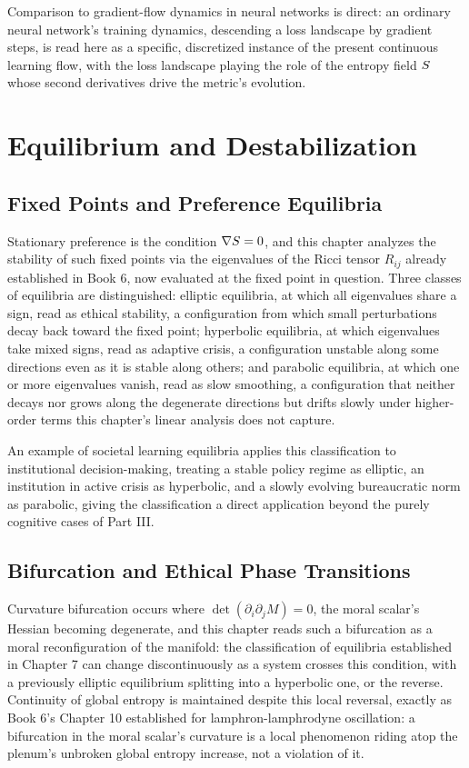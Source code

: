 Comparison to gradient-flow dynamics in neural networks is direct: an ordinary neural network's training dynamics, descending a loss landscape by gradient steps, is read here as a specific, discretized instance of the present continuous learning flow, with the loss landscape playing the role of the entropy field $S$ whose second derivatives drive the metric's evolution.

\part{Equilibrium and Destabilization}

\chapter{Fixed Points and Preference Equilibria}

Stationary preference is the condition $\nabla S = 0$, and this chapter analyzes the stability of such fixed points via the eigenvalues of the Ricci tensor $R_{ij}$ already established in Book 6, now evaluated at the fixed point in question. Three classes of equilibria are distinguished: elliptic equilibria, at which all eigenvalues share a sign, read as ethical stability, a configuration from which small perturbations decay back toward the fixed point; hyperbolic equilibria, at which eigenvalues take mixed signs, read as adaptive crisis, a configuration unstable along some directions even as it is stable along others; and parabolic equilibria, at which one or more eigenvalues vanish, read as slow smoothing, a configuration that neither decays nor grows along the degenerate directions but drifts slowly under higher-order terms this chapter's linear analysis does not capture.

An example of societal learning equilibria applies this classification to institutional decision-making, treating a stable policy regime as elliptic, an institution in active crisis as hyperbolic, and a slowly evolving bureaucratic norm as parabolic, giving the classification a direct application beyond the purely cognitive cases of Part III.

\chapter{Bifurcation and Ethical Phase Transitions}

Curvature bifurcation occurs where $\det(\partial_i \partial_j M) = 0$, the moral scalar's Hessian becoming degenerate, and this chapter reads such a bifurcation as a moral reconfiguration of the manifold: the classification of equilibria established in Chapter 7 can change discontinuously as a system crosses this condition, with a previously elliptic equilibrium splitting into a hyperbolic one, or the reverse. Continuity of global entropy is maintained despite this local reversal, exactly as Book 6's Chapter 10 established for lamphron-lamphrodyne oscillation: a bifurcation in the moral scalar's curvature is a local phenomenon riding atop the plenum's unbroken global entropy increase, not a violation of it.

